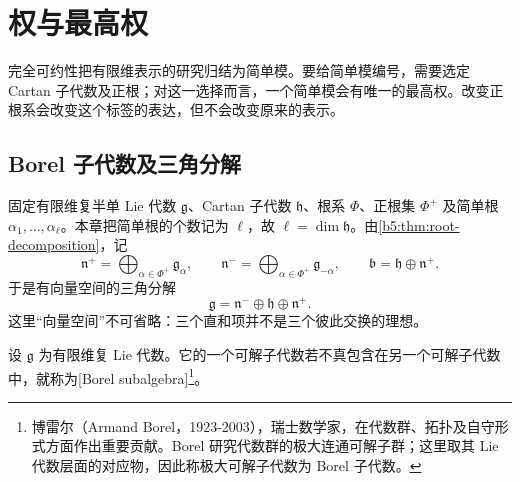 %
%

\section{权与最高权}
\label{b5:sec:1802}

完全可约性把有限维表示的研究归结为简单模。要给简单模编号，需要选定 Cartan 子代数及正根；对这一选择而言，一个简单模会有唯一的最高权。改变正根系会改变这个标签的表达，但不会改变原来的表示。

\subsection{Borel 子代数及三角分解}
\label{b5:subsec:1802:01}

固定有限维复半单 Lie 代数 \(\mathfrak g\)、Cartan 子代数 \(\mathfrak h\)、根系 \(\Phi\)、正根集 \(\Phi^+\) 及简单根 \(\alpha_1,\ldots,\alpha_\ell\)。本章把简单根的个数记为 \(\ell\)，故 \(\ell=\dim\mathfrak h\)。由\cref{b5:thm:root-decomposition}，记
\[
	\mathfrak n^+=\bigoplus_{\alpha\in\Phi^+}\mathfrak g_\alpha, \qquad \mathfrak n^-=\bigoplus_{\alpha\in\Phi^+}\mathfrak g_{-\alpha}, \qquad \mathfrak b=\mathfrak h\oplus\mathfrak n^+.
\]
于是有向量空间的三角分解
\[
	\mathfrak g=\mathfrak n^-\oplus\mathfrak h\oplus\mathfrak n^+.
\]
这里“向量空间”不可省略：三个直和项并不是三个彼此交换的理想。

\begin{definition}\label{b5:def:borel-subalgebra}
	设 \(\mathfrak g\) 为有限维复 Lie 代数。它的一个可解子代数若不真包含在另一个可解子代数中，就称为[Borel subalgebra]\footnote{博雷尔（Armand Borel，1923-2003），瑞士数学家，在代数群、拓扑及自守形式方面作出重要贡献。Borel 研究代数群的极大连通可解子群；这里取其 Lie 代数层面的对应物，因此称极大可解子代数为 Borel 子代数。}。
\end{definition}

